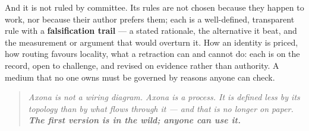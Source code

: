 \documentclass[nobib]{tufte-handout}
\begin{document}
And it is not ruled by committee. Its rules are not chosen because they happen to
work, nor because their author prefers them; each is a well-defined, transparent
rule with a \textbf{falsification trail} --- a stated rationale, the alternative
it beat, and the measurement or argument that would overturn it. How an identity
is priced, how routing favours locality, what a retraction can and cannot do:
each is on the record, open to challenge, and revised on evidence rather than
authority. A medium that no one owns must be governed by reasons anyone can check.

\vspace{0.8em}
\noindent\begin{quote}
\itshape\color{inkmuted}
Axona is not a wiring diagram. Axona is a process. It is defined less by its
topology than by what flows through it --- and that is no longer on paper.
{\bfseries\color{rust}The first version is in the wild; anyone can use it.}
\end{quote}
\end{document}
